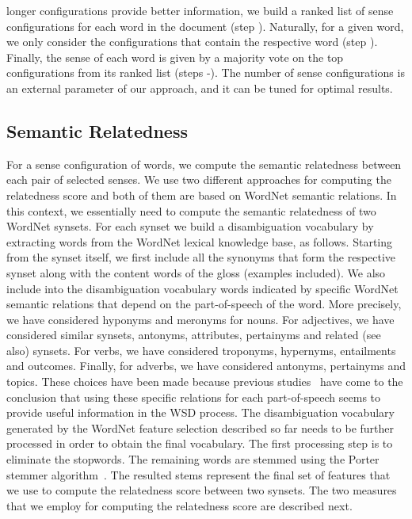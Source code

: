 \documentclass[11pt]{article}
\begin{document}
longer configurations provide better information, we build a ranked list of sense configurations for each word in the document (step ). Naturally, for a given word, we only consider the configurations that contain the respective word (step ). Finally, the sense of each word is given by a majority vote on the top  configurations from its ranked list (steps -). The number of sense configurations  is an external parameter of our approach, and it can be tuned for optimal results.
 
\subsection{Semantic Relatedness}
\label{sec_SemanticRelatedness} 

For a sense configuration of  words, we compute the semantic relatedness between each pair of selected senses. We use two different approaches for computing the relatedness score and both of them are based on WordNet semantic relations. In this context, we essentially need to compute the semantic relatedness of two WordNet synsets. For each synset we build a disambiguation vocabulary by extracting words from the WordNet lexical knowledge base, as follows. Starting from the synset itself, we first include all the synonyms that form the respective synset along with the content words of the gloss (examples included). We also include into the disambiguation vocabulary words indicated by specific WordNet semantic relations that depend on the part-of-speech of the word. More precisely, we have considered hyponyms and meronyms for nouns. For adjectives, we have considered similar synsets, antonyms, attributes, pertainyms and related (see also) synsets. For verbs, we have considered troponyms, hypernyms, entailments and outcomes. Finally, for adverbs, we have considered antonyms, pertainyms and topics. These choices have been made because previous studies~\cite{Banerjee-IJCAI-2003,Hristea-2008} have come to the conclusion that using these specific relations for each part-of-speech seems to provide useful information in the WSD process. The disambiguation vocabulary generated by the WordNet feature selection described so far needs to be further processed in order to obtain the final vocabulary. The first processing step is to eliminate the stopwords. The remaining words are stemmed using the Porter stemmer algorithm~\cite{Porter-1980}. The resulted stems represent the final set of features that we use to compute the relatedness score between two synsets. The two measures that we employ for computing the relatedness score are described next. 
\end{document}
